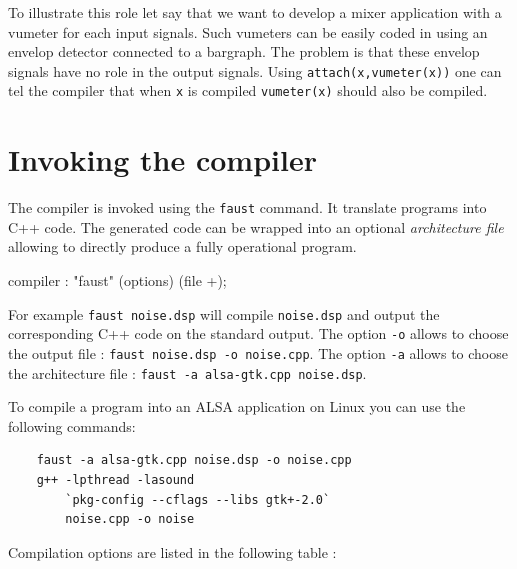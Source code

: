 \documentclass[a4paper,10pt]{book}
\begin{document}
To illustrate this role let say that we want to develop a mixer application with a vumeter for each input signals. Such vumeters can be easily coded in \faust using an envelop detector connected to a bargraph. The problem is that these envelop signals have no role in the output signals. Using \lstinline'attach(x,vumeter(x))' one can tel the compiler that when \lstinline'x' is compiled \lstinline'vumeter(x)' should also be compiled. 







\chapter{Invoking the \faust compiler}
The \faust compiler is invoked using the \texttt{faust} command. It translate \faust programs into C++ code.
The generated code can be wrapped into an optional \emph{architecture file} allowing to directly produce a fully operational program.

\begin{rail}
compiler : "faust" (options) (file +);
\end{rail}

For example \lstinline'faust noise.dsp' will compile \lstinline'noise.dsp' and output the corresponding C++ code on the standard output.  The option \lstinline'-o' allows to choose the output file : \lstinline'faust noise.dsp -o noise.cpp'. The option \lstinline'-a' allows to choose the architecture file : \lstinline'faust -a alsa-gtk.cpp noise.dsp'. 

To compile a \faust program into an ALSA application on Linux you can use the following commands: 
\begin{lstlisting}
	faust -a alsa-gtk.cpp noise.dsp -o noise.cpp
	g++ -lpthread -lasound  
		`pkg-config --cflags --libs gtk+-2.0` 
		noise.cpp -o noise
\end{lstlisting} 


Compilation options are listed in the following table :

\bigskip

\small
\end{document}
